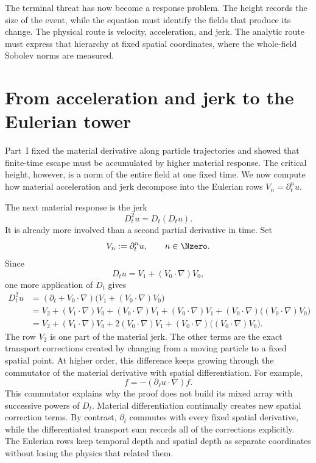 The terminal threat has now become a response problem.  The height records the
size of the event, while the equation must identify the fields that produce
its change.  The physical route is velocity, acceleration, and jerk.  The
analytic route must express that hierarchy at fixed spatial coordinates,
where the whole-field Sobolev norms are measured.

\section{From acceleration and jerk to the Eulerian tower}

Part~I fixed the material derivative along particle trajectories and showed
that finite-time escape must be accumulated by higher material response.  The
critical height, however, is a norm of the entire field at one fixed time.  We
now compute how material acceleration and jerk decompose into the Eulerian rows
\(V_n=\partial_t^n u\).

The next material response is the jerk
\begin{equation*}
 D_t^2u=D_t(D_tu).
\end{equation*}
It is already more involved than a second partial derivative in time.  Set
\begin{equation*}
 V_n:=\partial_t^nu,
 \qquad n\in\Nzero.
\end{equation*}
Since
\begin{equation*}
 D_tu=V_1+(V_0\cdot\nabla)V_0,
\end{equation*}
one more application of \(D_t\) gives
\begin{align*}
 D_t^2u
 &=(\partial_t+V_0\cdot\nabla)
   \bigl(V_1+(V_0\cdot\nabla)V_0\bigr)
 \\
 &=V_2
   +(V_1\cdot\nabla)V_0
   +(V_0\cdot\nabla)V_1
   +(V_0\cdot\nabla)V_1
   +(V_0\cdot\nabla)\bigl((V_0\cdot\nabla)V_0\bigr)
 \\
 &=V_2
   +(V_1\cdot\nabla)V_0
   +2(V_0\cdot\nabla)V_1
   +(V_0\cdot\nabla)\bigl((V_0\cdot\nabla)V_0\bigr).
\end{align*}
The row \(V_2\) is one part of the material jerk.  The other terms are the
exact transport corrections created by changing from a moving particle to a
fixed spatial point.  At higher order, this difference keeps growing through
the commutator of the material derivative with spatial differentiation.  For
example,
\begin{equation*}
 [D_t,\partial_\ell]f
 =-(\partial_\ell u\cdot\nabla)f.
\end{equation*}
This commutator explains why the proof does not build its mixed array with
successive powers of \(D_t\).  Material differentiation continually creates
new spatial correction terms.  By contrast, \(\partial_t\) commutes with every
fixed spatial derivative, while the differentiated transport sum records all
of the corrections explicitly.  The Eulerian rows keep temporal depth and
spatial depth as separate coordinates without losing the physics that related
them.

